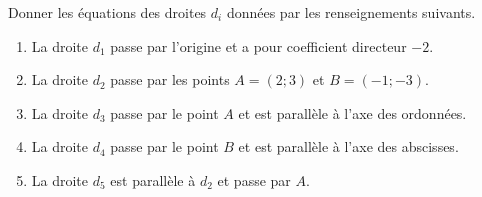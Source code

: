 
\begin{exercice}\label{exosmath-0239}

    Donner les équations des droites \( d_i\) données par les renseignements suivants.
    \begin{enumerate}
        \item
            La droite \( d_1\) passe par l'origine et a pour coefficient directeur \( -2\).
        \item
            La droite \( d_2\) passe par les points \( A=(2;3)\) et \( B=(-1;-3)\).
        \item
            La droite \( d_3\) passe par le point \( A\) et est parallèle à l'axe des ordonnées.
        \item
            La droite \( d_4\) passe par le point \( B\) et est parallèle à l'axe des abscisses.
        \item
            La droite \( d_5\) est parallèle à \( d_2\) et passe par \( A\).
    \end{enumerate}

\end{exercice}
